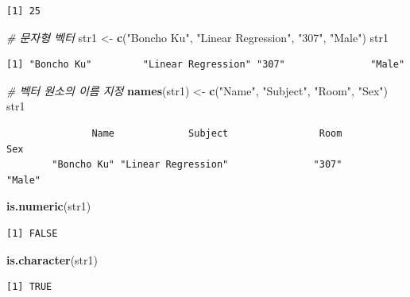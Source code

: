 \documentclass[11pt,a4paper]{book}
\newenvironment{Shaded}{\begin{snugshade}}{\end{snugshade}}
\newcommand{\KeywordTok}[1]{\textcolor[rgb]{0.13,0.29,0.53}{\textbf{#1}}}
\newcommand{\StringTok}[1]{\textcolor[rgb]{0.31,0.60,0.02}{#1}}
\newcommand{\CommentTok}[1]{\textcolor[rgb]{0.56,0.35,0.01}{\textit{#1}}}
\newcommand{\NormalTok}[1]{#1}
\theoremstyle{definition}
\theoremstyle{definition}
\theoremstyle{definition}
\theoremstyle{remark}
\begin{document}
\begin{verbatim}
[1] 25
\end{verbatim}

\begin{Shaded}
\begin{Highlighting}[]
\CommentTok{# 문자형 벡터}
\NormalTok{str1 <-}\StringTok{ }\KeywordTok{c}\NormalTok{(}\StringTok{"Boncho Ku"}\NormalTok{, }\StringTok{"Linear Regression"}\NormalTok{, }\StringTok{"307"}\NormalTok{, }\StringTok{"Male"}\NormalTok{)}
\NormalTok{str1}
\end{Highlighting}
\end{Shaded}

\begin{verbatim}
[1] "Boncho Ku"         "Linear Regression" "307"               "Male"             
\end{verbatim}

\begin{Shaded}
\begin{Highlighting}[]
\CommentTok{# 벡터 원소의 이름 지정}
\KeywordTok{names}\NormalTok{(str1) <-}\StringTok{ }\KeywordTok{c}\NormalTok{(}\StringTok{"Name"}\NormalTok{, }\StringTok{"Subject"}\NormalTok{, }\StringTok{"Room"}\NormalTok{, }\StringTok{"Sex"}\NormalTok{)}
\NormalTok{str1}
\end{Highlighting}
\end{Shaded}

\begin{verbatim}
               Name             Subject                Room                 Sex 
        "Boncho Ku" "Linear Regression"               "307"              "Male" 
\end{verbatim}

\begin{Shaded}
\begin{Highlighting}[]
\KeywordTok{is.numeric}\NormalTok{(str1)}
\end{Highlighting}
\end{Shaded}

\begin{verbatim}
[1] FALSE
\end{verbatim}

\begin{Shaded}
\begin{Highlighting}[]
\KeywordTok{is.character}\NormalTok{(str1)}
\end{Highlighting}
\end{Shaded}

\begin{verbatim}
[1] TRUE
\end{verbatim}
\end{document}
